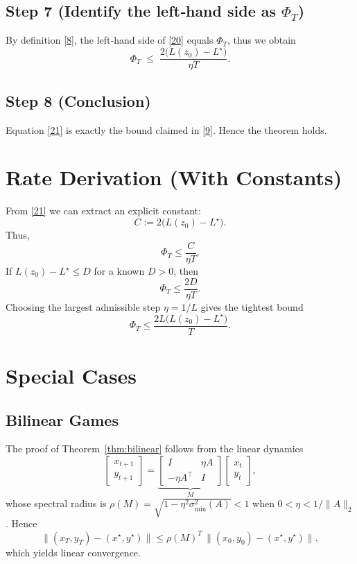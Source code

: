 \documentclass[11pt]{article}
\begin{document}
\subsection*{Step 7 (Identify the left‑hand side as $\Phi_T$)}
By definition \eqref{8}, the left‑hand side of \eqref{20} equals $\Phi_T$, thus we obtain
\[
\Phi_T \;\le\; \frac{2\bigl(L(z_0)-L^{\star}\bigr)}{\eta T}.
\tag{21}
\]

\subsection*{Step 8 (Conclusion)}
Equation \eqref{21} is exactly the bound claimed in \eqref{9}. Hence the theorem holds. \hfill\qedsymbol

\section{Rate Derivation (With Constants)}
From \eqref{21} we can extract an explicit constant:
\[
C:=2\bigl(L(z_0)-L^{\star}\bigr).
\]
Thus,
\[
\Phi_T\le \frac{C}{\eta T}.
\]
If $L(z_0)-L^{\star}\le D$ for a known $D>0$, then
\[
\Phi_T\le \frac{2D}{\eta T}.
\]
Choosing the largest admissible step $\eta=1/L$ gives the tightest bound
\[
\Phi_T\le \frac{2L\bigl(L(z_0)-L^{\star}\bigr)}{T}.
\]

\section{Special Cases}
\subsection{Bilinear Games}
The proof of Theorem~\ref{thm:bilinear} follows from the linear dynamics
\[
\begin{bmatrix}x_{t+1}\\ y_{t+1}\end{bmatrix}
=
\underbrace{\begin{bmatrix} I & \eta A\\ -\eta A^{\top} & I\end{bmatrix}}_{M}
\begin{bmatrix}x_{t}\\ y_{t}\end{bmatrix},
\]
whose spectral radius is $\rho(M)=\sqrt{1-\eta^{2}\sigma_{\min}^{2}(A)}<1$ when $0<\eta<1/\|A\|_{2}$. Hence
\[
\bigl\|(x_T,y_T)-(x^{\star},y^{\star})\bigr\|
\le \rho(M)^{T}\,\bigl\|(x_0,y_0)-(x^{\star},y^{\star})\bigr\|,
\]
which yields linear convergence.
\end{document}
